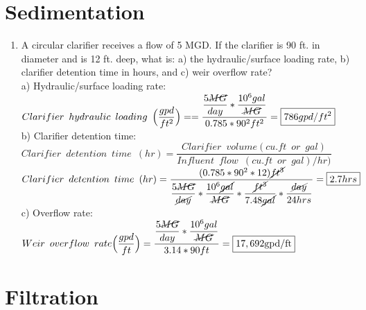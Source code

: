 \documentclass{article}
\begin{document}
\section{Sedimentation}
\begin{enumerate}
\item A circular clarifier receives a flow of 5 MGD.  If the clarifier is 90 ft. in diameter and is 12 ft. deep, what is: a) the hydraulic/surface loading rate, b) clarifier detention time in hours, and c) weir overflow rate?\\
		\vspace{0.2cm}
a) Hydraulic/surface loading rate:\\
$Clarifier \enspace hydraulic \enspace loading \enspace 	\Big(\dfrac{gpd}{ft^2}\Big) ==\dfrac{\dfrac{5\cancel{MG}}{{day}}*\dfrac{10^6gal}{\cancel{MG}}}{0.785*90^2 ft^2}=\boxed{786gpd/ft^2}$\\
		\vspace{0.5cm}
b) Clarifier detention time:\\
$Clarifier \enspace detention \enspace time \enspace (hr) = 	\dfrac{ Clarifier \enspace volume (cu.ft \enspace or \enspace gal)}{Influent \enspace flow \enspace (cu.ft \enspace or \enspace gal)/hr)}$\\
		\vspace{0.2cm}
$Clarifier \enspace detention \enspace time \enspace (hr) = 	\dfrac{(0.785*90^2*12)\cancel{ft^3}}{\dfrac{5\cancel{MG}}{\cancel{day}}*\dfrac{10^6\cancel{gal}}{\cancel{MG}}*\dfrac{\cancel{ft^3}}{7.48\cancel{gal}}*\dfrac{\cancel{day}}{24hrs}}=\boxed{2.7hrs}$\\
		\vspace{0.5cm}
c) Overflow rate:\\
		\vspace{0.2cm} 
$Weir \enspace overflow \enspace rate \Big(\dfrac{gpd}{ft}\Big) =\dfrac{\dfrac{5\cancel{MG}}{{day}}*\dfrac{10^6gal}{\cancel{MG}}}{3.14*90 ft}=\boxed{17,692 \mathrm{gpd}/\mathrm{ft}}$\\
\end{enumerate}

\section{Filtration}
\end{document}
